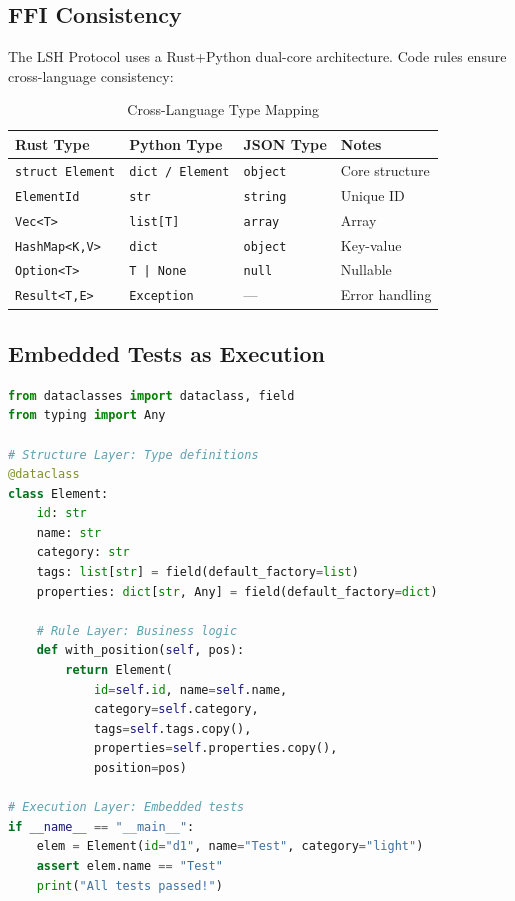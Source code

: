 \documentclass{article}
\begin{document}
\subsection{FFI Consistency}

The LSH Protocol uses a Rust+Python dual-core architecture. Code rules ensure cross-language consistency:

\begin{table}[h]
\centering
\caption{Cross-Language Type Mapping}
\label{tab:type-mapping}
\begin{tabular}{l|l|l|l}
\toprule
\textbf{Rust Type} & \textbf{Python Type} & \textbf{JSON Type} & \textbf{Notes} \\
\midrule
\texttt{struct Element} & \texttt{dict / Element} & \texttt{object} & Core structure \\
\texttt{ElementId} & \texttt{str} & \texttt{string} & Unique ID \\
\texttt{Vec<T>} & \texttt{list[T]} & \texttt{array} & Array \\
\texttt{HashMap<K,V>} & \texttt{dict} & \texttt{object} & Key-value \\
\texttt{Option<T>} & \texttt{T | None} & \texttt{null} & Nullable \\
\texttt{Result<T,E>} & \texttt{Exception} & --- & Error handling \\
\bottomrule
\end{tabular}
\end{table}

\subsection{Embedded Tests as Execution}

\begin{lstlisting}[language=Python, caption={Python: Three-layer in code}]
from dataclasses import dataclass, field
from typing import Any

# Structure Layer: Type definitions
@dataclass
class Element:
    id: str
    name: str
    category: str
    tags: list[str] = field(default_factory=list)
    properties: dict[str, Any] = field(default_factory=dict)

    # Rule Layer: Business logic
    def with_position(self, pos):
        return Element(
            id=self.id, name=self.name,
            category=self.category,
            tags=self.tags.copy(),
            properties=self.properties.copy(),
            position=pos)

# Execution Layer: Embedded tests
if __name__ == "__main__":
    elem = Element(id="d1", name="Test", category="light")
    assert elem.name == "Test"
    print("All tests passed!")
\end{lstlisting}
\end{document}
